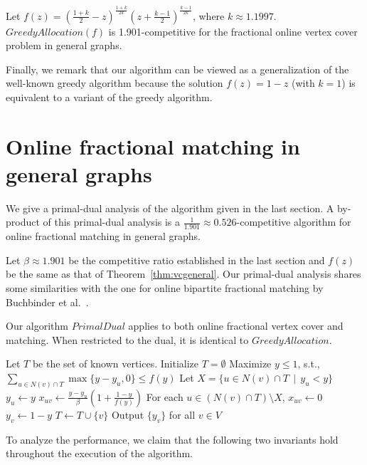 \documentclass{article}
\begin{document}
\begin{theorem}
\label{thm:vcgeneral}
Let $f(z)=\left(\frac{1+k}{2}-z\right)^{\frac{1+k}{2k}}\left(z+\frac{k-1}{2}\right)^{\frac{k-1}{2k}}$, where $k\approx1.1997$. $GreedyAllocation(f)$ is 1.901-competitive for the fractional online vertex cover problem in general graphs.
\end{theorem}

Finally, we remark that our algorithm can be viewed as a generalization of the well-known greedy algorithm because the solution $f(z)=1-z$ (with $k=1$) is equivalent to a variant of the greedy algorithm.

\section{Online fractional matching in general graphs}
We give a primal-dual analysis of the algorithm given in the last section. 
A by-product of this primal-dual analysis is a $\frac{1}{1.901}\approx 0.526$-competitive algorithm for online fractional matching in general graphs.

Let $\beta\approx 1.901$ be the competitive ratio established in the last section and $f(z)$ be the same as that of Theorem~\ref{thm:vcgeneral}. Our primal-dual analysis shares some similarities with the one for online bipartite fractional matching by Buchbinder et al.~\cite{Buchbinder2007}.


Our algorithm $PrimalDual$ applies to both online fractional vertex cover and matching.  When restricted to the dual, it is identical to $GreedyAllocation$. 

\begin{algorithm}[h!]
\SetAlgoLined
\caption{$PrimalDual$}
\label{alg:general greedy}
Let $T$ be the set of known vertices. Initialize $T=\emptyset$\;
{
Maximize $y\le 1$, s.t., $\sum_{u\in N(v)\cap T} \max\{y-y_u,0\} \leq f(y)$\;
Let $X = \{u \in N(v)\cap T \,\mid\, y_u < y\}$\;
{
$y_u\leftarrow y$\;
$x_{uv}\longleftarrow \frac{y-y_u}{\beta}\left(1+\frac{1-y}{f(y)}\right)$\;
}
For each $u \in (N(v)\cap T)\setminus X$, $x_{uv}\longleftarrow 0$\;
$y_v \leftarrow 1-y$\;
$T\leftarrow T\cup \{v\}$\;
}
Output $\{y_v\}$ for all $v\in V$\;
\end{algorithm}

To analyze the performance, we claim that the following two invariants hold throughout the execution of the algorithm.
\end{document}
